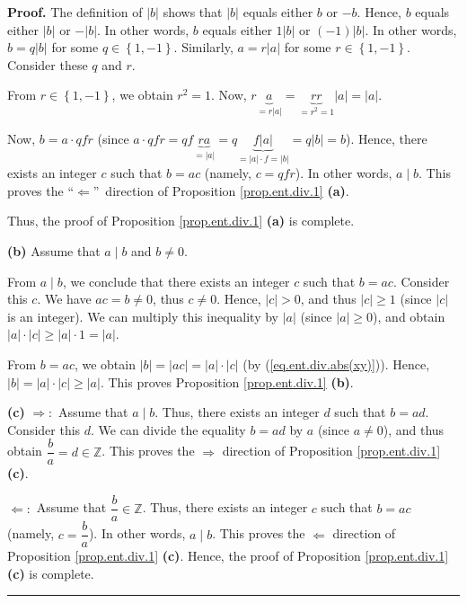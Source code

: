 \documentclass[numbers=enddot,12pt,final,onecolumn,notitlepage]{scrartcl}%
\numberwithin{exer}{subsection}
\theoremstyle{definition}
\newenvironment{proof}[1][Proof]{\noindent\textbf{#1.} }{\ \rule{0.5em}{0.5em}}
\begin{document}
\begin{proof}
The definition of $\left\vert b\right\vert $ shows that $\left\vert
b\right\vert $ equals either $b$ or $-b$. Hence, $b$ equals either $\left\vert
b\right\vert $ or $-\left\vert b\right\vert $. In other words, $b$ equals
either $1\left\vert b\right\vert $ or $\left(  -1\right)  \left\vert
b\right\vert $. In other words, $b=q\left\vert b\right\vert $ for some
$q\in\left\{  1,-1\right\}  $. Similarly, $a=r\left\vert a\right\vert $ for
some $r\in\left\{  1,-1\right\}  $. Consider these $q$ and $r$.

From $r\in\left\{  1,-1\right\}  $, we obtain $r^{2}=1$. Now, $r\underbrace{a}%
_{=r\left\vert a\right\vert }=\underbrace{rr}_{=r^{2}=1}\left\vert
a\right\vert =\left\vert a\right\vert $.

Now, $b=a\cdot qfr$ (since $a\cdot qfr=qf\underbrace{ra}_{=\left\vert
a\right\vert }=q\underbrace{f\left\vert a\right\vert }_{=\left\vert
a\right\vert \cdot f=\left\vert b\right\vert }=q\left\vert b\right\vert =b$).
Hence, there exists an integer $c$ such that $b=ac$ (namely, $c=qfr$). In
other words, $a\mid b$. This proves the \textquotedblleft$\Longleftarrow
$\textquotedblright\ direction of Proposition \ref{prop.ent.div.1}
\textbf{(a)}.

Thus, the proof of Proposition \ref{prop.ent.div.1} \textbf{(a)} is complete.

\textbf{(b)} Assume that $a\mid b$ and $b\neq0$.

From $a\mid b$, we conclude that there exists an integer $c$ such that $b=ac$.
Consider this $c$. We have $ac=b\neq0$, thus $c\neq0$. Hence, $\left\vert
c\right\vert >0$, and thus $\left\vert c\right\vert \geq1$ (since $\left\vert
c\right\vert $ is an integer). We can multiply this inequality by $\left\vert
a\right\vert $ (since $\left\vert a\right\vert \geq0$), and obtain $\left\vert
a\right\vert \cdot\left\vert c\right\vert \geq\left\vert a\right\vert
\cdot1=\left\vert a\right\vert $.

From $b=ac$, we obtain $\left\vert b\right\vert =\left\vert ac\right\vert
=\left\vert a\right\vert \cdot\left\vert c\right\vert $ (by
(\ref{eq.ent.div.abs(xy)})). Hence, $\left\vert b\right\vert =\left\vert
a\right\vert \cdot\left\vert c\right\vert \geq\left\vert a\right\vert $. This
proves Proposition \ref{prop.ent.div.1} \textbf{(b)}.

\textbf{(c)} $\Longrightarrow:$ Assume that $a\mid b$. Thus, there exists an
integer $d$ such that $b=ad$. Consider this $d$. We can divide the equality
$b=ad$ by $a$ (since $a\neq0$), and thus obtain $\dfrac{b}{a}=d\in\mathbb{Z}$.
This proves the $\Longrightarrow$ direction of Proposition
\ref{prop.ent.div.1} \textbf{(c)}.

$\Longleftarrow:$ Assume that $\dfrac{b}{a}\in\mathbb{Z}$. Thus, there exists
an integer $c$ such that $b=ac$ (namely, $c=\dfrac{b}{a}$). In other words,
$a\mid b$. This proves the $\Longleftarrow$ direction of Proposition
\ref{prop.ent.div.1} \textbf{(c)}. Hence, the proof of Proposition
\ref{prop.ent.div.1} \textbf{(c)} is complete.
\end{proof}
\end{document}
